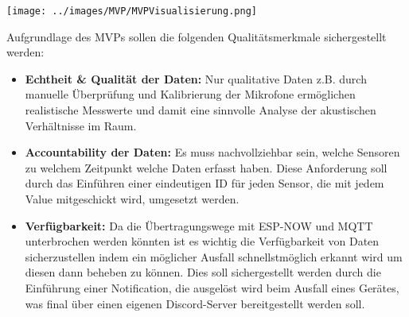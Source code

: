 \begin{center}
  \texttt{[image: ../images/MVP/MVPVisualisierung.png]}
\end{center}

Aufgrundlage des MVPs sollen die folgenden Qualitätsmerkmale sichergestellt werden:
\begin{itemize}
    \item \textbf{Echtheit \& Qualität der Daten:}
    Nur qualitative Daten z.B. durch manuelle Überprüfung und Kalibrierung der Mikrofone ermöglichen realistische Messwerte und damit eine sinnvolle Analyse der akustischen Verhältnisse im Raum.
\item \textbf{Accountability der Daten:}
    Es muss nachvollziehbar sein, welche Sensoren zu welchem Zeitpunkt welche Daten erfasst haben. Diese Anforderung soll durch das Einführen einer eindeutigen ID für jeden Sensor, die mit jedem Value mitgeschickt wird, umgesetzt werden.
    \item \textbf{Verfügbarkeit:}
    Da die Übertragungswege mit ESP-NOW und MQTT unterbrochen werden könnten ist es wichtig die Verfügbarkeit von Daten sicherzustellen indem ein möglicher Ausfall schnellstmöglich erkannt wird um diesen dann beheben zu können. Dies soll sichergestellt werden durch die Einführung einer Notification, die ausgelöst wird beim Ausfall eines Gerätes, was final über einen eigenen Discord-Server bereitgestellt werden soll.
\end{itemize}
